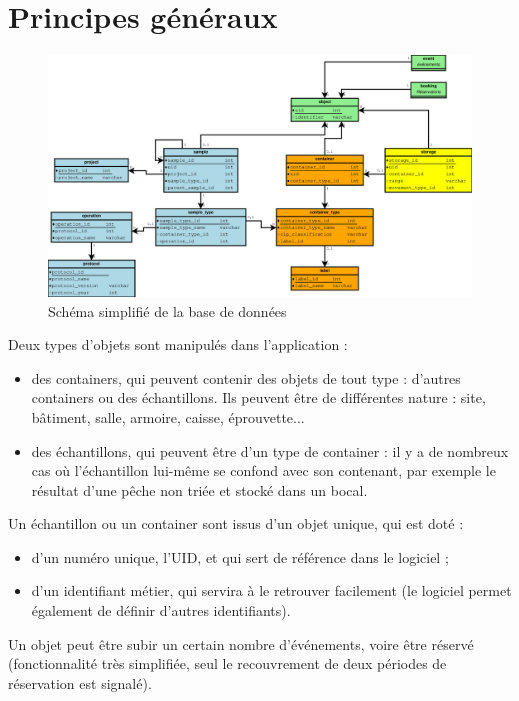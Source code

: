 \section{Principes généraux}

\begin{figure}[th]
\includegraphics[width=\linewidth]{images/db_schema_simplifie}
\caption{Schéma simplifié de la base de données}
\end{figure}

Deux types d'objets sont manipulés dans l'application :
\begin{itemize}
\item des containers, qui peuvent contenir des objets de tout type : d'autres containers ou des échantillons. Ils peuvent être de différentes nature : site, bâtiment, salle, armoire, caisse, éprouvette...
\item des échantillons, qui peuvent être d'un type de container : il y a de nombreux cas où l'échantillon lui-même se confond avec son contenant, par exemple le résultat d'une pêche non triée et stocké dans un bocal.
\end{itemize}

Un échantillon ou un container sont issus d'un objet unique, qui est doté :
\begin{itemize}
\item d'un numéro unique, l'UID, et qui sert de référence dans le logiciel ;
\item d'un identifiant métier, qui servira à le retrouver facilement (le logiciel permet également de définir d'autres identifiants).
\end{itemize}

Un objet peut être subir un certain nombre d'événements, voire être réservé (fonctionnalité très simplifiée, seul le recouvrement de deux périodes de réservation est signalé).

